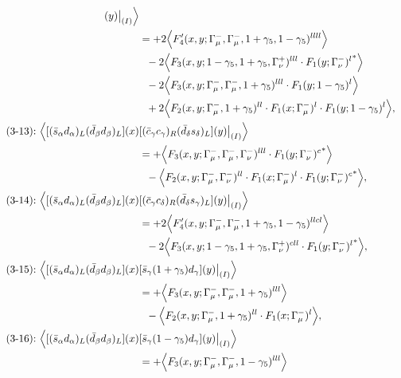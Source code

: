 \begin{align}
[(\bar s_\gamma s_\delta)_R(\bar d_\delta s_\gamma)_L](y)\big|_{(I)}
\Big\rangle
\notag\\*
&=
 + 2\Big\langle F_4'(x,y;\Gamma_\mu^-,\Gamma_\mu^-,1+\gamma_5,1-\gamma_5)^{llll}\Big\rangle
\notag\\*&\ \ 
-2\Big\langle F_3(x,y;1-\gamma_5,1+\gamma_5,\Gamma_\nu^+)^{lll} \cdot {F_1(y;\Gamma_\nu^-)^l}^*\Big\rangle
\notag\\*&\ \ 
-2\Big\langle F_3(x,y;\Gamma_\mu^-,\Gamma_\mu^-,1+\gamma_5)^{lll} \cdot F_1(y;1-\gamma_5)^l\Big\rangle
\notag\\*&\ \ 
 + 2\Big\langle F_2(x,y;\Gamma_\mu^-,1+\gamma_5)^{ll} \cdot F_1(x;\Gamma_\mu^-)^l \cdot F_1(y;1-\gamma_5)^l\Big\rangle,
\\
\mbox{(3-13):}\ 
\Big\langle
[(\bar s_\alpha d_\alpha)_L(\bar d_\beta d_\beta)_L](x)&
[(\bar c_\gamma c_\gamma)_R(\bar d_\delta s_\delta)_L](y)\big|_{(I)}
\Big\rangle
\notag\\*
&=
 + \Big\langle F_3(x,y;\Gamma_\mu^-,\Gamma_\mu^-,\Gamma_\nu^-)^{lll} \cdot {F_1(y;\Gamma_\nu^-)^c}^*\Big\rangle
\notag\\*&\ \ 
 - \Big\langle F_2(x,y;\Gamma_\mu^-,\Gamma_\nu^-)^{ll} \cdot F_1(x;\Gamma_\mu^-)^l \cdot {F_1(y;\Gamma_\nu^-)^c}^*\Big\rangle,
\\
\mbox{(3-14):}\ 
\Big\langle
[(\bar s_\alpha d_\alpha)_L(\bar d_\beta d_\beta)_L](x)&
[(\bar c_\gamma c_\delta)_R(\bar d_\delta s_\gamma)_L](y)\big|_{(I)}
\Big\rangle
\notag\\*
&=
 + 2\Big\langle F_4'(x,y;\Gamma_\mu^-,\Gamma_\mu^-,1+\gamma_5,1-\gamma_5)^{llcl}\Big\rangle
\notag\\*&\ \ 
-2\Big\langle F_3(x,y;1-\gamma_5,1+\gamma_5,\Gamma_\nu^+)^{cll} \cdot {F_1(y;\Gamma_\nu^-)^l}^*\Big\rangle,
\\
\mbox{(3-15):}\ 
\Big\langle
[(\bar s_\alpha d_\alpha)_L(\bar d_\beta d_\beta)_L](x)&
[\bar s_\gamma (1 + \gamma_5) d_\gamma](y)\big|_{(I)}
\Big\rangle
\notag\\*
&=
 + \Big\langle F_3(x,y;\Gamma_\mu^-,\Gamma_\mu^-,1+\gamma_5)^{lll}\Big\rangle
\notag\\*&\ \ 
 - \Big\langle F_2(x,y;\Gamma_\mu^-,1+\gamma_5)^{ll} \cdot F_1(x;\Gamma_\mu^-)^l\Big\rangle,
\\
\mbox{(3-16):}\ 
\Big\langle
[(\bar s_\alpha d_\alpha)_L(\bar d_\beta d_\beta)_L](x)&
[\bar s_\gamma (1 - \gamma_5) d_\gamma](y)\big|_{(I)}
\Big\rangle
\notag\\*
&=
 + \Big\langle F_3(x,y;\Gamma_\mu^-,\Gamma_\mu^-,1-\gamma_5)^{lll}\Big\rangle
\notag\\*&\ \ 

\end{align}

